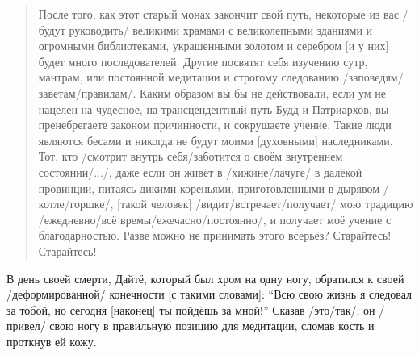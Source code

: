 \begin{ver}
\begin{quote}
  После того, как этот старый монах закончит свой путь, некоторые из
  вас /будут руководить/ великими храмами с
  великолепными зданиями и огромными библиотеками, украшенными золотом
  и серебром [и у них] будет много последователей.
  Другие посвятят себя изучению сутр, мантрам,
  или постоянной медитации и строгому следованию
  /заповедям/заветам/правилам/. Каким образом вы бы не действовали,
  если ум не нацелен на чудесное, на трансцендентный путь Будд и
  Патриархов, вы пренебрегаете законом причинности, и сокрушаете
  учение.
  Такие люди являются бесами и никогда не будут моими
  [духовными] наследниками. Тот, кто /смотрит внутрь себя/заботится о
  своём внутреннем состоянии/.../, даже если он живёт в /хижине/лачуге/
  в далёкой провинции, питаясь
  дикими кореньями, приготовленными в
  дырявом /котле/горшке/, [такой человек]
  /видит/встречает/получает/ мою традицию /ежедневно/всё
  времы/ежечасно/постоянно/, и получает моё учение с благодарностью.
  Разве можно не принимать этого всерьёз? Старайтесь! Старайтесь!
\end{quote}

В день своей смерти, Дайтё, который был хром на одну ногу, обратился к
своей /деформированной/ конечности [с такими словами]: ``Всю свою
жизнь я следовал за тобой, но сегодня [наконец] ты пойдёшь за
мной!'' Сказав /это/так/, он /привел/ свою ногу в правильную позицию для
медитации, сломав кость и проткнув ей кожу. 
\end{ver}
